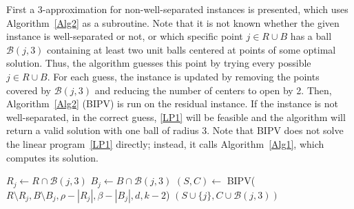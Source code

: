 First a 3-approximation for non-well-separated instances is presented, which uses {Algorithm~\ref{Alg2}} as a subroutine. Note that it is not known whether the given instance is well-separated or not, or which specific point $j \in R \cup B$ has a ball $\mathcal{B}(j, 3)$ containing at least two unit balls centered at points of some optimal solution. Thus, the algorithm guesses this point by trying every possible $j \in R \cup B$. For each guess, the instance is updated by removing the points covered by $\mathcal{B}(j, 3)$ and reducing the number of centers to open by 2. Then, {Algorithm~\ref{Alg2}} (BIPV) is run on the residual instance. If the instance is not well-separated, in the correct guess, \ref{LP1} will be feasible and the algorithm will return a valid solution with one ball of radius 3. Note that BIPV does not solve the linear program~\ref{LP1} directly; instead, it calls {Algorithm~\ref{Alg1}}, which computes its solution.

\begin{algorithm}[H]
\caption{Non-well-separated-instances($R, B, \rho, \beta, d, k$)}
    \label{non-separated-algo}
    \begin{algorithmic}[1]
        \State $R_j \gets R \cap \mathcal{B}(j, 3)$
        \State $B_j \gets B \cap \mathcal{B}(j, 3)$
            \State $(S,C) \gets$ BIPV($R \setminus R_j, B \setminus B_j, \rho - |R_j|, \beta - |B_j|, d, k - 2$)
            \State \Return $(S \cup \{j\}, C \cup \mathcal{B}(j, 3))$
        \EndIf
    \EndFor
    \end{algorithmic}
\end{algorithm}

